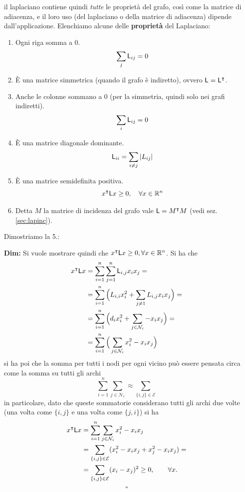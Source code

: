 il laplaciano contiene quindi \textit{tutte} le propriet\`a del grafo, cos\`i come la matrice di adiacenza, e il loro uso (del laplaciano o della matrice di adiacenza) dipende dall'applicazione. Elenchiamo alcune delle
\textbf{propriet\`a} del Laplaciano:
\begin{enumerate}
\item Ogni riga somma a $0$.
        \[ \sum_{j} \mathsf{L}_{ij} = 0 \]
\item \`E una matrice simmetrica (quando il grafo \`e indiretto), ovvero $\mathsf{L} = \mathsf{L}^\intercal$.
\item Anche le colonne sommano a $0$ (per la simmetria, quindi solo nei grafi indiretti).
        \[ \sum_{i} \mathsf{L}_{ij} = 0 \]
\item \`E una matrice diagonale dominante.
        \[ \mathsf{L}_{ii} = \sum_{i \neq j} |L_{ij}| \]
\item \`E una matrice semidefinita positiva.
        \[ x^\intercal \mathsf{L} x \geq 0, \quad \forall x \in \mathbb{R}^n \]
\item Detta $M$ la matrice di incidenza del grafo vale $\mathsf{L} = M^\intercal M$ (vedi sez. \ref{sec:lapinc}).
\end{enumerate}
Dimostriamo la 5.:
\begin{tcolorbox}
\textbf{Dim:} Si vuole mostrare quindi che $x^\intercal \mathsf{L} x \geq 0, \forall x \in \mathbb{R}^n$.
Si ha che
\begin{align*}
x^\intercal \mathsf{L} x &= \sum_{i=1}^n \sum_{j=1}^n \mathsf{L}_{i,j} x_i x_j = \\
&= \sum_{i=1}^n \Big ( L_{i,i} x_i^2 + \sum_{j\neq1} L_{i,j} x_i x_j \Big ) = \\ 
&= \sum_{i=1}^n \Big (d_i x_i^2 + \sum_{j \in \mathcal{N}_i} -x_i x_j \Big ) = \\
&= \sum_{i=1}^n \Big ( \sum_{j \in \mathcal{N}_i} x_i^2 - x_i x_j \Big )
\end{align*}
si ha poi che la somma per tutti i nodi per ogni vicino pu\`o essere pensata circa come la somma su tutti gli archi
\begin{equation*}
\sum_{i=1}^n \sum_{j \in \mathcal{N}_i} \approx \sum_{\{i,j\} \in \mathcal{E}}
\end{equation*}
in particolare, dato che queste sommatorie considerano tutti gli archi due volte (una volta come $\{i,j\}$ e una volta come $\{j,i\}$) si ha
\begin{align*}
x^\intercal \mathsf{L} x &= \sum_{i=1}^n \sum_{j \in \mathcal{N}_i} x_i^2 - x_i x_j \\
&= \sum_{\{i,j\} \in \mathcal{E}} (x_i^2 - x_i x_j + x_j^2 - x_i x_j) = \\ 
&= \sum_{\{i,j\} \in \mathcal{E}} (x_i - x_j)^2 \geq 0, \qquad \forall x.
\end{align*}
\[
\square
\]
\end{tcolorbox}
